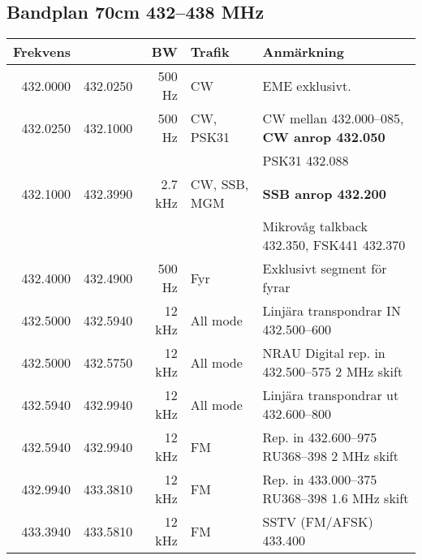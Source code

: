 \begin{landscape}
\subsection{Bandplan 70cm 432--438 MHz}
\begin{tabular}{rrrll}
	\textbf{Frekvens}         &               & \textbf{BW}   & \textbf{Trafik}     & \textbf{Anmärkning}                                          \\ \hline
	         432.0000         & 432.0250      & 500 Hz        & CW                  & EME exklusivt.                                               \\ \hline
	         432.0250         & 432.1000      & 500 Hz        & CW, PSK31           & CW mellan 432.000--085, \textbf{CW anrop 432.050}            \\
                                  &               &               &                     & PSK31 432.088                                                \\ \hline
	         432.1000         & 432.3990      & 2.7 kHz       & CW, SSB, MGM        & \textbf{SSB anrop 432.200}                                   \\
                                  &               &               &                     & Mikrovåg talkback 432.350, FSK441 432.370                    \\ \hline
	         432.4000         & 432.4900      & 500 Hz        & Fyr                 & Exklusivt segment för fyrar                                  \\ \hline
	         432.5000         & 432.5940      & 12 kHz        & All mode            & Linjära transpondrar IN 432.500--600                         \\ \hline
	         432.5000         & 432.5750      & 12 kHz        & All mode            & NRAU Digital rep. in 432.500--575 2 MHz skift                \\ \hline
	         432.5940         & 432.9940      & 12 kHz        & All mode            & Linjära transpondrar ut 432.600--800                         \\ \hline
	         432.5940         & 432.9940      & 12 kHz        & FM                  & Rep. in 432.600--975 RU368--398 2 MHz skift                  \\ \hline
	         432.9940         & 433.3810      & 12 kHz        & FM                  & Rep. in 433.000--375 RU368--398 1.6 MHz skift                \\ \hline
	         433.3940         & 433.5810      & 12 kHz        & FM                  & SSTV (FM/AFSK) 433.400                                       \\

\end{tabular}
\end{landscape}
